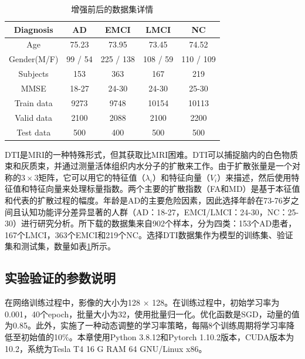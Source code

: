 \begin{table}[ht]
\centering
\caption{增强前后的数据集详情}\label{paper3sourceData}
\begin{tabular}{ccccc}
\hline
\normalsize
Diagnosis      & \multicolumn{1}{c}{AD}      & \multicolumn{1}{c}{EMCI}      & \multicolumn{1}{c}{LMCI}     & \multicolumn{1}{c}{NC}        \\ \hline
Age            & \multicolumn{1}{c}{75.23}   & \multicolumn{1}{c}{73.95}     & \multicolumn{1}{c}{73.45}    & \multicolumn{1}{c}{74.52}     \\
Gender(M/F)   & \multicolumn{1}{c}{99 / 54} & \multicolumn{1}{c}{225 / 138} & \multicolumn{1}{c}{108 / 59} & \multicolumn{1}{c}{110 / 109} \\
Subjects       & \multicolumn{1}{c}{153}     & \multicolumn{1}{c}{363}       & \multicolumn{1}{c}{167}      & \multicolumn{1}{c}{219}       \\
MMSE           & \multicolumn{1}{c}{18-27}   & \multicolumn{1}{c}{24-30}     & \multicolumn{1}{c}{24-30}    & \multicolumn{1}{c}{25-30}     \\ \hline\hline
Train data & \multicolumn{1}{c}{9273}    & \multicolumn{1}{c}{9748}      & \multicolumn{1}{c}{10154}    & \multicolumn{1}{c}{10113}     \\
Valid data & \multicolumn{1}{c}{2100}    & \multicolumn{1}{c}{2088}      & \multicolumn{1}{c}{2100}     & \multicolumn{1}{c}{2200}      \\
Test data   & \multicolumn{1}{c}{500}     & \multicolumn{1}{c}{400}       & \multicolumn{1}{c}{500}      & \multicolumn{1}{c}{500}       \\ \hline
\end{tabular}
\end{table}

DTI是MRI的一种特殊形式，但其获取比MRI困难。DTI可以捕捉脑内的白色物质束和灰质束，并通过测量活体组织内水分子的扩散来工作。由于扩散张量是一个对称的$3 \times3$矩阵，它可以用它的特征值（$\lambda_{i}$）和特征向量（$V_{i}$）来描述，然后使用特征值和特征向量来处理标量指数。两个主要的扩散指数（FA和MD）是基于本征值和代表的扩散过程的幅度。年龄是AD的主要危险因素，因此选择年龄在73-76岁之间且认知功能评分差异显著的人群（AD：18-27，EMCI/LMCI：24-30，NC：25-30）进行研究分析。所下载的数据集来自902个样本，分为四类：153个AD患者，167个LMCI，363个EMCI和219个NC。选择DTI数据集作为模型的训练集、验证集和测试集，数量如表\ref{paper3sourceData}所示。

\subsection{实验验证的参数说明}
在网络训练过程中，影像的大小为128 × 128。在训练过程中，初始学习率为0.001，40个epoch，批量大小为32，使用批量归一化。优化函数是SGD，动量的值为0.85。此外，实施了一种动态调整的学习率策略，每隔8个训练周期将学习率降低至初始值的10\%。本章使用Python 3.8.12和Pytorch 1.10.2版本，CUDA版本为10.2，系统为Tesla T4 16 G RAM 64 GNU/Linux x86。

